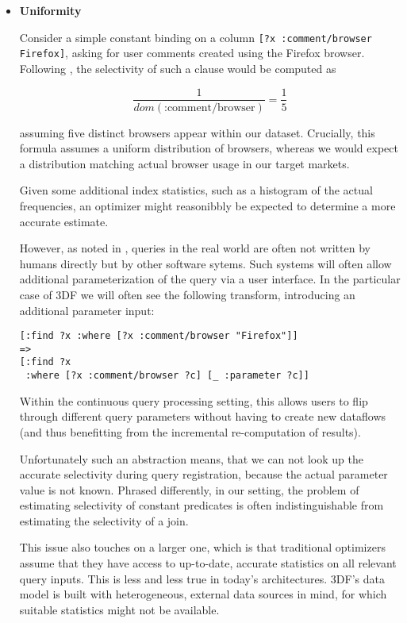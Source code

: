 \documentclass[../index.tex]{subfiles}
\begin{document}
\begin{itemize}
\item \textbf{Uniformity}

  Consider a simple constant binding on a column \texttt{[?x
      :comment/browser Firefox]}, asking for user comments created using
  the Firefox browser. Following \cite{selinger1979access}, the
  selectivity of such a clause would be computed as

  \begin{equation}
    \dfrac{1}{dom(\text{:comment/browser})} = \dfrac{1}{5}
  \end{equation}

  assuming five distinct browsers appear within our dataset. Crucially,
  this formula assumes a uniform distribution of browsers, whereas we
  would expect a distribution matching actual browser usage in our
  target markets.

  Given some additional index statistics, such as a histogram of the
  actual frequencies, an optimizer might reasonibbly be expected to
  determine a more accurate estimate.

  However, as noted in \cite{lohman2014query}, queries in the real world
  are often not written by humans directly but by other software
  sytems. Such systems will often allow additional parameterization of
  the query via a user interface. In the particular case of 3DF we will
  often see the following transform, introducing an additional parameter
  input:

\begin{verbatim}
[:find ?x :where [?x :comment/browser "Firefox"]]
=>
[:find ?x 
 :where [?x :comment/browser ?c] [_ :parameter ?c]]
\end{verbatim}

Within the continuous query processing setting, this allows users to
flip through different query parameters without having to create new
dataflows (and thus benefitting from the incremental re-computation of
results).

Unfortunately such an abstraction means, that we can not look up the
accurate selectivity during query registration, because the actual
parameter value is not known. Phrased differently, in our setting, the
problem of estimating selectivity of constant predicates is often
indistinguishable from estimating the selectivity of a join.

This issue also touches on a larger one, which is that traditional
optimizers assume that they have access to up-to-date, accurate
statistics on all relevant query inputs. This is less and less true in
today's architectures. 3DF's data model is built with heterogeneous,
external data sources in mind, for which suitable statistics might not
be available.


\end{itemize}
\end{document}
